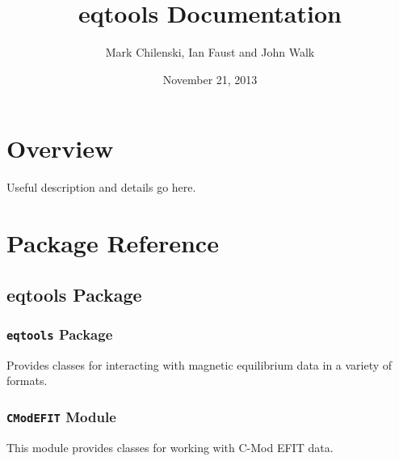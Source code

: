 \documentclass[letterpaper,10pt,english]{sphinxmanual}
\title{eqtools Documentation}
\date{November 21, 2013}
\author{Mark Chilenski, Ian Faust and John Walk}
\begin{document}
\maketitle
\tableofcontents
{}\label{index::doc}



\chapter{Overview}
\label{index:overview}\label{index:eqtools-tools-for-interacting-with-magnetic-equilibria}
Useful description and details go here.


\chapter{Package Reference}
\label{index:package-reference}

\section{eqtools Package}
\label{eqtools::doc}\label{eqtools:eqtools-package}

\subsection{\texttt{eqtools} Package}
\label{eqtools:id1}\label{eqtools:module-eqtools.__init__}
Provides classes for interacting with magnetic equilibrium data in a variety of formats.


\subsection{\texttt{CModEFIT} Module}
\label{eqtools:module-eqtools.CModEFIT}\label{eqtools:cmodefit-module}
This module provides classes for working with C-Mod EFIT data.
\end{document}
